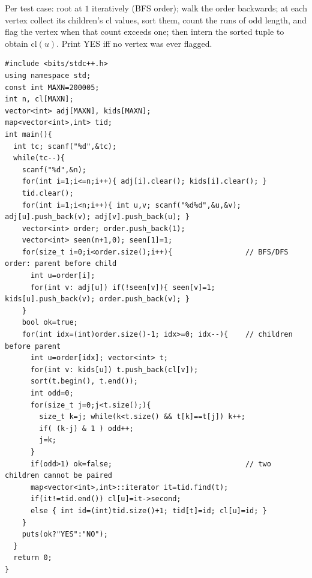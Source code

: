 Per test case: root at \(1\) iteratively (BFS order); walk the order backwards; at
each vertex collect its children's \(\mathrm{cl}\) values, sort them, count the
runs of odd length, and flag the vertex when that count exceeds one; then intern
the sorted tuple to obtain \(\mathrm{cl}(u)\).  Print YES iff no vertex was ever
flagged.

\begin{lstlisting}[caption={CF 1800G. One shared interned labeller + a per-vertex odd-run count. Iterative rooting (sum n = 2e5). ASCII only, identifiers without underscores}, label={lst:c22-symmetree}]
#include <bits/stdc++.h>
using namespace std;
const int MAXN=200005;
int n, cl[MAXN];
vector<int> adj[MAXN], kids[MAXN];
map<vector<int>,int> tid;
int main(){
  int tc; scanf("%d",&tc);
  while(tc--){
    scanf("%d",&n);
    for(int i=1;i<=n;i++){ adj[i].clear(); kids[i].clear(); }
    tid.clear();
    for(int i=1;i<n;i++){ int u,v; scanf("%d%d",&u,&v); adj[u].push_back(v); adj[v].push_back(u); }
    vector<int> order; order.push_back(1);
    vector<int> seen(n+1,0); seen[1]=1;
    for(size_t i=0;i<order.size();i++){                 // BFS/DFS order: parent before child
      int u=order[i];
      for(int v: adj[u]) if(!seen[v]){ seen[v]=1; kids[u].push_back(v); order.push_back(v); }
    }
    bool ok=true;
    for(int idx=(int)order.size()-1; idx>=0; idx--){    // children before parent
      int u=order[idx]; vector<int> t;
      for(int v: kids[u]) t.push_back(cl[v]);
      sort(t.begin(), t.end());
      int odd=0;
      for(size_t j=0;j<t.size();){
        size_t k=j; while(k<t.size() && t[k]==t[j]) k++;
        if( (k-j) & 1 ) odd++;
        j=k;
      }
      if(odd>1) ok=false;                               // two children cannot be paired
      map<vector<int>,int>::iterator it=tid.find(t);
      if(it!=tid.end()) cl[u]=it->second;
      else { int id=(int)tid.size()+1; tid[t]=id; cl[u]=id; }
    }
    puts(ok?"YES":"NO");
  }
  return 0;
}
\end{lstlisting}

